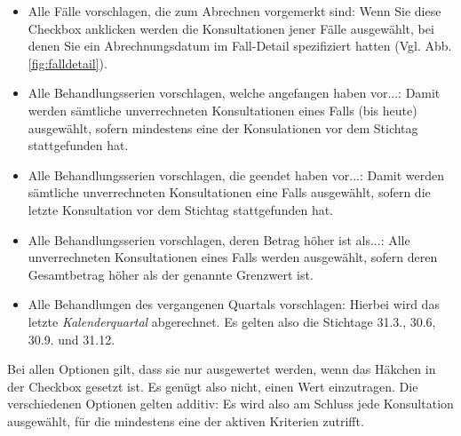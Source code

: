 \begin{itemize}
\item Alle Fälle vorschlagen, die zum Abrechnen vorgemerkt sind: Wenn Sie diese Checkbox anklicken werden die Konsultationen jener Fälle ausgewählt, bei denen Sie ein Abrechnungsdatum im Fall-Detail spezifiziert hatten (Vgl. Abb. \ref{fig:falldetail}).
\item Alle Behandlungsserien vorschlagen, welche angefangen haben vor...: Damit werden sämtliche unverrechneten Konsultationen eines Falls (bis heute) ausgewählt, sofern mindestens eine der Konsulationen vor dem Stichtag stattgefunden hat.
\item Alle Behandlungsserien vorschlagen, die geendet haben vor...: Damit werden sämtliche unverrechneten Konsultationen eine Falls ausgewählt, sofern die letzte Konsultation vor dem Stichtag stattgefunden hat.
\item Alle Behandlungsserien vorschlagen, deren Betrag höher ist als...: Alle unverrechneten Konsultationen eines Falls werden ausgewählt, sofern deren Gesamtbetrag höher als der genannte Grenzwert ist.
\item Alle Behandlungen des vergangenen Quartals vorschlagen: Hierbei wird das letzte \textit{Kalenderquartal} abgerechnet. Es gelten also die Stichtage 31.3., 30.6, 30.9. und 31.12.
\end{itemize}
Bei allen Optionen gilt, dass sie nur ausgewertet werden, wenn das Häkchen in der Checkbox gesetzt ist. Es genügt also nicht, einen Wert einzutragen. Die verschiedenen Optionen gelten additiv: Es wird also am Schluss jede Konsultation ausgewählt, für die mindestens eine der aktiven Kriterien zutrifft.

\medskip

\clearpage

